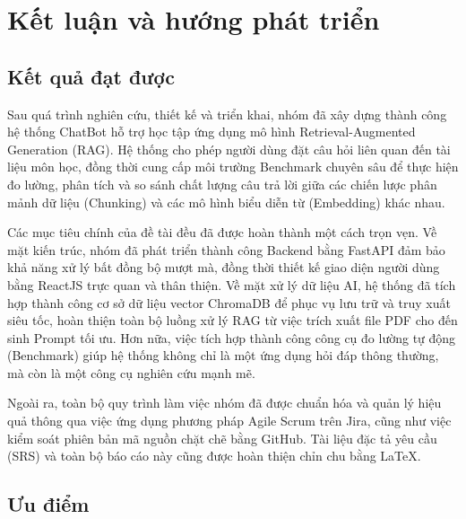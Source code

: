 \chapter{Kết luận và hướng phát triển}

\section{Kết quả đạt được}

Sau quá trình nghiên cứu, thiết kế và triển khai, nhóm đã xây dựng thành công hệ thống ChatBot hỗ trợ học tập ứng dụng mô hình Retrieval-Augmented Generation (RAG). Hệ thống cho phép người dùng đặt câu hỏi liên quan đến tài liệu môn học, đồng thời cung cấp môi trường Benchmark chuyên sâu để thực hiện đo lường, phân tích và so sánh chất lượng câu trả lời giữa các chiến lược phân mảnh dữ liệu (Chunking) và các mô hình biểu diễn từ (Embedding) khác nhau.

Các mục tiêu chính của đề tài đều đã được hoàn thành một cách trọn vẹn. Về mặt kiến trúc, nhóm đã phát triển thành công Backend bằng FastAPI đảm bảo khả năng xử lý bất đồng bộ mượt mà, đồng thời thiết kế giao diện người dùng bằng ReactJS trực quan và thân thiện. Về mặt xử lý dữ liệu AI, hệ thống đã tích hợp thành công cơ sở dữ liệu vector ChromaDB để phục vụ lưu trữ và truy xuất siêu tốc, hoàn thiện toàn bộ luồng xử lý RAG từ việc trích xuất file PDF cho đến sinh Prompt tối ưu. Hơn nữa, việc tích hợp thành công công cụ đo lường tự động (Benchmark) giúp hệ thống không chỉ là một ứng dụng hỏi đáp thông thường, mà còn là một công cụ nghiên cứu mạnh mẽ. 

Ngoài ra, toàn bộ quy trình làm việc nhóm đã được chuẩn hóa và quản lý hiệu quả thông qua việc ứng dụng phương pháp Agile Scrum trên Jira, cũng như việc kiểm soát phiên bản mã nguồn chặt chẽ bằng GitHub. Tài liệu đặc tả yêu cầu (SRS) và toàn bộ báo cáo này cũng được hoàn thiện chỉn chu bằng LaTeX.

\section{Ưu điểm}

